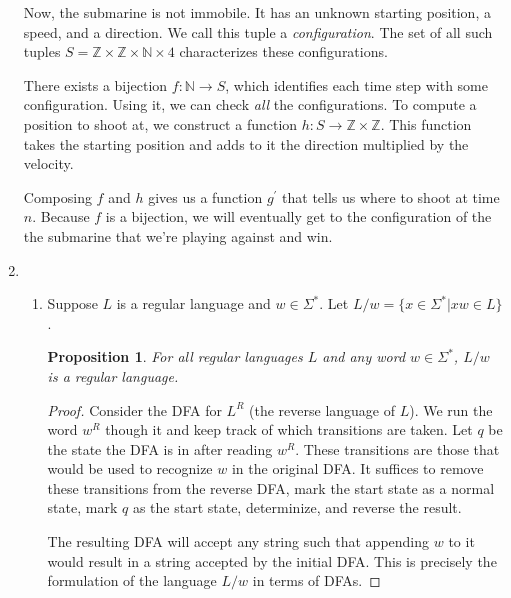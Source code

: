 \documentclass[letterpaper,11pt]{article}
\newtheorem{proposition}{Proposition}
\newcommand{\Z}{\mathbb{Z}}
\newcommand{\N}{\mathbb{N}}
\begin{document}
\begin{enumerate}
        Now, the submarine is not immobile. It has an unknown starting
        position, a speed, and a direction. We call this tuple a
        \emph{configuration}. The set of all such tuples
        $S = \Z \times \Z \times \N \times 4$ characterizes these
        configurations.

        There exists a bijection $f : \N \to S$, which identifies each time
        step with some configuration. Using it, we can check \emph{all} the
        configurations. To compute a position to shoot at, we construct a
        function $h : S \to \Z \times \Z$. This function takes the starting
        position and adds to it the direction multiplied by the velocity.

        Composing $f$ and $h$ gives us a function $g^\prime$ that tells us
        where to shoot at time $n$. Because $f$ is a bijection, we will
        eventually get to the configuration of the the submarine that we're
        playing against and win.

    \item
        \begin{enumerate}
            \item
                Suppose $L$ is a regular language and $w \in \Sigma^*$. Let
                $L/w = \{x \in \Sigma^* | xw \in L\}$.

                \begin{proposition}
                    For all regular languages $L$ and any word $w \in
                    \Sigma^*$, $L/w$ is a regular language.
                \end{proposition}

                \begin{proof}
                    Consider the DFA for $L^R$ (the reverse language of $L$).
                    We run the word $w^R$ though it and keep track of which
                    transitions are taken. Let $q$ be the state the DFA is in
                    after reading $w^R$.  These transitions are those that
                    would be used to recognize $w$ in the original DFA. It
                    suffices to remove these transitions from the reverse DFA,
                    mark the start state as a normal state, mark $q$ as the
                    start state, determinize, and reverse the result.

                    The resulting DFA will accept any string such that
                    appending $w$ to it would result in a string accepted by
                    the initial DFA.  This is precisely the formulation of the
                    language $L/w$ in terms of DFAs.


\end{proof}
\end{enumerate}
\end{enumerate}
\end{document}
